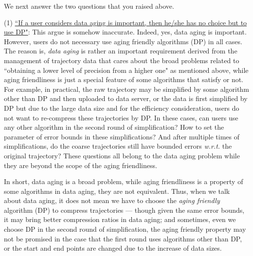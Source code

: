 \documentclass{letter}
\newcommand{\wrt}{\emph{w.r.t.}\xspace}
\begin{document}
We next answer the two questions that you raised above.



(1) \underline{``If a user considers data aging is important, then he/she has no choice but to use DP"}: This argue is somehow inaccurate. Indeed, yes, data aging is important. However, users do not necessary use aging friendly algorithms (DP) in all cases. The reason is,
\emph{data aging} is rather an important requirement derived from the management of trajectory data that cares about the broad problems related to ``obtaining a lower level of precision from a higher one" as mentioned above, while aging friendliness is just a special feature of some algorithms that satisfy or not. For example, in practical, the raw trajectory may be simplified by some algorithm other than DP and then uploaded to data server, or the data is first simplified by DP but due to the large data size and for the efficiency consideration, users do not want to re-compress these trajectories by DP. In these cases, can users use any other algorithm in the second round of simplification? How to set the parameter of error bounds in these simplifications? And after multiple times of simplifications, do the coarse trajectories still have bounded errors \wrt the original trajectory? These questions all belong to the data aging problem while they are beyond the scope of the aging friendliness.

In short, data aging is a broad problem, while aging friendliness is a property of some algorithms in data aging, they are not equivalent. Thus, when we talk about data aging, it does not mean we have to choose the \emph{aging friendly} algorithm (DP) to compress trajectories --- though given the same error bounds, it may bring better compression ratios in data aging; and sometimes, even we choose DP in the second round of simplification, the aging friendly property may not be promised in the case that the first round uses algorithms other than DP, or the start and end points are changed due to the increase of data sizes.
\end{document}
